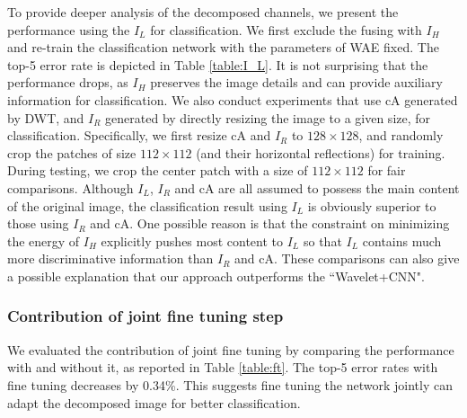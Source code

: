 \documentclass[letterpaper]{article} %
\begin{document}
To provide deeper analysis of the decomposed channels, we present the performance using the $I_L$ for classification. We first exclude the fusing with $I_H$ and re-train the classification network with the parameters of WAE fixed. The top-5 error rate is depicted in Table \ref{table:I_L}. It is not surprising that the performance drops, as $I_H$ preserves the image details and can provide auxiliary information for classification. We also conduct experiments that use cA generated by DWT, and $I_R$ generated by directly resizing the image to a given size, for classification. Specifically, we first resize cA and $I_R$ to $128 \times 128$, and randomly crop the patches of size $112 \times 112$ (and their horizontal reflections) for training. During testing, we crop the center patch with a size of $112 \times 112$ for fair comparisons. Although $I_L$, $I_R$ and cA are all assumed to possess the main content of the original image, the classification result using $I_L$ is obviously superior to those using $I_R$ and cA. One possible reason is that the constraint on minimizing the energy of $I_H$ explicitly pushes most content to $I_L$ so that $I_L$ contains much more discriminative information than $I_R$ and cA. These comparisons can also give a possible explanation that our approach outperforms the ``Wavelet+CNN".



\subsubsection{Contribution of joint fine tuning step}
We evaluated the contribution of joint fine tuning by comparing the performance with and without it, as reported in Table \ref{table:ft}. The top-5 error rates with fine tuning decreases by 0.34\%. This suggests fine tuning the network jointly can adapt the decomposed image for better classification.
\end{document}

